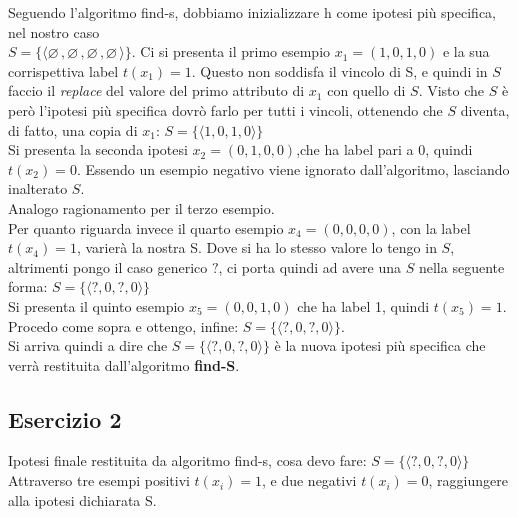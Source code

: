 Seguendo l'algoritmo find-s, dobbiamo inizializzare h come ipotesi più specifica, nel nostro caso\\  $S = \{\langle \varnothing \, , \varnothing \, ,\varnothing \, ,\varnothing \, \rangle\}$. Ci si presenta il primo esempio $x_1 = (1,0,1,0)$ e la sua corrispettiva label $t(x_1) = 1$. Questo non soddisfa il vincolo di S, e quindi in $S$ faccio il \textit{replace} del valore del primo attributo di $x_1$ con quello di $S$. Visto che $S$ è però l'ipotesi più specifica dovrò farlo per tutti i vincoli, ottenendo che $S$ diventa, di fatto, una copia di $x_1$: $S = \{\langle 1,0,1,0\rangle\}$ \\
Si presenta la seconda ipotesi $x_2 =(0,1,0,0)$,che ha label pari a 0, quindi $t(x_2)=0$. Essendo un esempio negativo viene ignorato dall'algoritmo, lasciando inalterato $S$.\\Analogo ragionamento per il terzo esempio.\\
Per quanto riguarda invece il quarto esempio $x_4 = (0,0,0,0)$, con la label $t(x_4) = 1$, varierà la nostra S. 
Dove si ha lo stesso valore lo tengo in $S$, altrimenti pongo il caso generico $?$, ci porta quindi ad avere una $S$ nella seguente forma: $S = \{\langle ?,0,?,0\rangle\}$ \\
Si presenta il quinto esempio $x_5=(0,0,1,0)$ che ha label 1, quindi $t(x_5)=1$. Procedo come sopra e ottengo, infine: $S=\{\langle ?,0,?,0\rangle\}$. \\ \newline Si arriva quindi a dire che $S=\{\langle ?,0,?,0\rangle\}$ è la nuova ipotesi più specifica che verrà restituita dall'algoritmo \textbf{find-S}.

\subsection{Esercizio 2}
Ipotesi finale restituita da algoritmo find-s, cosa devo fare: $S=\{\langle ?,0,?,0\rangle\}$\\
Attraverso tre esempi positivi $t(x_i) = 1$, e due negativi $t(x_i) = 0$, raggiungere alla ipotesi dichiarata S.\\

